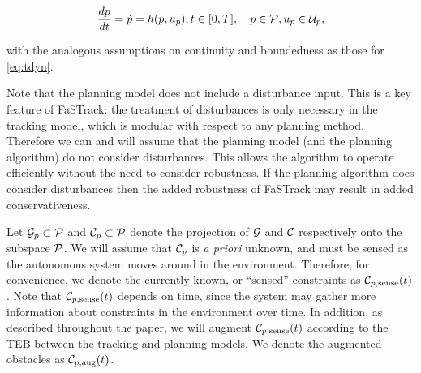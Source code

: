 \begin{align}
\label{eq:pdyn}
\frac{d\pstate}{d\tvar} = \dot{\pstate} = \pdyn(\pstate, \pctrl), \tvar \in [0, \thor], \quad \pstate \in \pset, \pctrl \in \pcset,
\end{align}

\noindent with the analogous assumptions on continuity and boundedness as those for \eqref{eq:tdyn}.

Note that the planning model does not include a disturbance input. 
This is a key feature of FaSTrack: the treatment of disturbances is only necessary in the tracking model, which is modular with respect to any planning method. Therefore we can and will assume that the planning model (and the planning algorithm) do not consider disturbances. This allows the algorithm to operate efficiently without the need to consider robustness. If the planning algorithm does consider disturbances then the added robustness of FaSTrack may result in added conservativeness.

Let $\mathcal G_p \subset \mathcal{P}$ and $\mathcal C_p \subset \mathcal{P}$ denote the projection of $\mathcal G$ and $\mathcal C$ respectively onto the subspace $\mathcal{P}$.
We will assume that $\mathcal C_p$ is \textit{a priori} unknown, and must be sensed as the autonomous system moves around in the environment.
Therefore, for convenience, we denote the currently known, or ``sensed'' constraints as $\mathcal C_{p,\text{sense}}(t)$.
Note that $\mathcal C_{p,\text{sense}}(t)$ depends on time, since the system may gather more information about constraints in the environment over time.
In addition, as described throughout the paper, we will augment $\mathcal C_{p,\text{sense}}(t)$ according to the TEB between the tracking and planning models.
We denote the augmented obstacles as $\mathcal C_{p,\text{aug}}(t)$.



